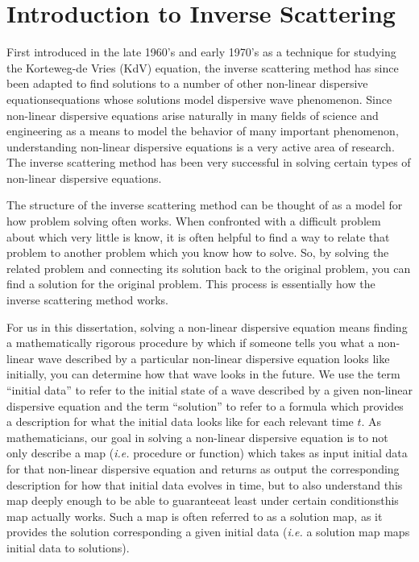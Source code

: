 \documentclass[../dissertation.tex]{subfiles}
\begin{document}
\section{Introduction to Inverse Scattering}\label{sec0:IST}

First introduced in the late 1960's and early 1970's as a technique for studying 
the Korteweg-de Vries (KdV) equation, the inverse scattering method has since 
been adapted to find solutions to a number of other non-linear dispersive 
equations\textemdash{}equations whose solutions model dispersive wave 
phenomenon. Since non-linear dispersive equations arise naturally in many fields 
of science and engineering as a means to model the behavior of many important 
phenomenon, understanding non-linear dispersive equations is a very active 
area of research. 
The inverse scattering method has been very successful in solving certain types 
of non-linear dispersive equations.

The structure of the inverse scattering method can be thought of as a model 
for how problem solving often works. When confronted with a dif{}ficult problem
about which very little is know, it is often helpful to find a way to relate
that problem to another problem which you know how to solve. So, by solving 
the related problem and connecting its solution back to the original problem, 
you can find a solution for the original problem. This process is essentially
how the inverse scattering method works. 

For us in this dissertation, solving a non-linear dispersive equation means 
finding a mathematically rigorous procedure by which if someone tells you what 
a non-linear wave described by a particular non-linear dispersive equation looks 
like initially, you can determine how that wave looks in the future. We use the 
term ``initial data'' to refer to the initial state of a wave described by a 
given non-linear dispersive equation and the term ``solution'' to refer to 
a formula which provides a description for what the initial data looks like 
for each relevant time $t$.
As mathematicians, our goal in solving a 
non-linear dispersive equation is to not only describe a map (\textit{i.e.} 
procedure or function) which takes as input initial data for that non-linear 
dispersive equation and returns as output the corresponding description for how 
that initial data evolves in time, but to also understand this map deeply enough 
to be able to guarantee\textemdash{}at least under certain 
conditions\textemdash{}this map actually works. Such a map is often 
referred to as a solution map, as it provides the solution corresponding a given
initial data (\textit{i.e.} a solution map maps initial data to solutions). 
\end{document}

